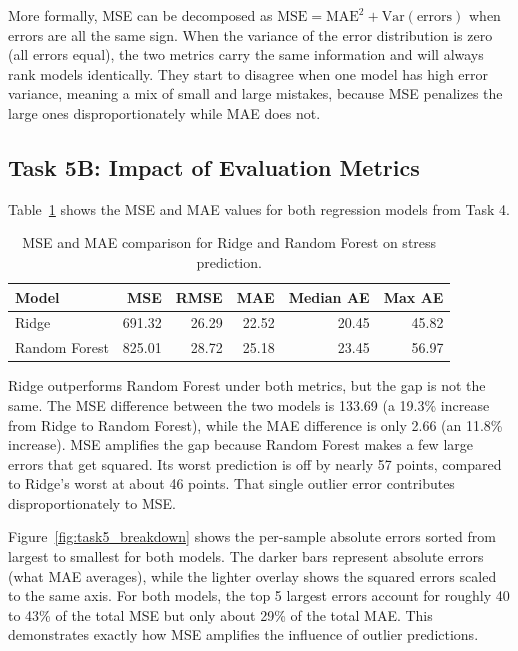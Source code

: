 More formally, MSE can be decomposed as $\text{MSE} = \text{MAE}^2 + \text{Var}(\text{errors})$ when errors are all the same sign. When the variance of the error distribution is zero (all errors equal), the two metrics carry the same information and will always rank models identically. They start to disagree when one model has high error variance, meaning a mix of small and large mistakes, because MSE penalizes the large ones disproportionately while MAE does not.

\subsection*{Task 5B: Impact of Evaluation Metrics}

Table~\ref{tab:task5_metrics} shows the MSE and MAE values for both regression models from Task 4.

\begin{table}[h]
\caption{MSE and MAE comparison for Ridge and Random Forest on stress prediction.}
\label{tab:task5_metrics}
\centering
\begin{tabular}{|l|r|r|r|r|r|}
\hline
Model & MSE & RMSE & MAE & Median AE & Max AE \\
\hline
Ridge & 691.32 & 26.29 & 22.52 & 20.45 & 45.82 \\
Random Forest & 825.01 & 28.72 & 25.18 & 23.45 & 56.97 \\
\hline
\end{tabular}
\end{table}

Ridge outperforms Random Forest under both metrics, but the gap is not the same. The MSE difference between the two models is 133.69 (a 19.3\% increase from Ridge to Random Forest), while the MAE difference is only 2.66 (an 11.8\% increase). MSE amplifies the gap because Random Forest makes a few large errors that get squared. Its worst prediction is off by nearly 57 points, compared to Ridge's worst at about 46 points. That single outlier error contributes disproportionately to MSE.

Figure~\ref{fig:task5_breakdown} shows the per-sample absolute errors sorted from largest to smallest for both models. The darker bars represent absolute errors (what MAE averages), while the lighter overlay shows the squared errors scaled to the same axis. For both models, the top 5 largest errors account for roughly 40 to 43\% of the total MSE but only about 29\% of the total MAE. This demonstrates exactly how MSE amplifies the influence of outlier predictions.

